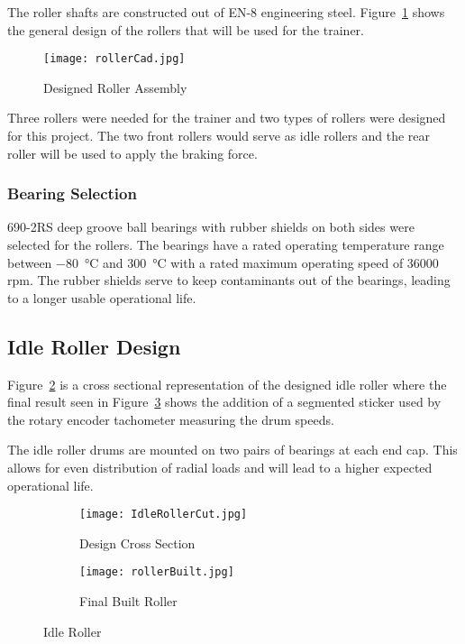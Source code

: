The roller shafts are constructed out of EN-8 engineering steel. Figure~\ref{fig:rollerGen} shows the general design of the rollers that will be used for the trainer.

\begin{figure}[H]
	\centering
	\texttt{[image: rollerCad.jpg]}
	\caption{Designed Roller Assembly}
	\label{fig:rollerGen}
\end{figure}

\vspace*{-0.7cm}

Three rollers were needed for the trainer and two types of rollers were designed for this project. The two front rollers would serve as idle rollers and the rear roller will be used to apply the braking force. 

\subsubsection{Bearing Selection}

690-2RS deep groove ball bearings with rubber shields on both sides were selected for the rollers. The bearings have a rated operating temperature range between \SI{-80}{\degreeCelsius} and \SI{300}{\degreeCelsius} with a rated maximum operating speed of 36000 \ac{rpm}. The rubber shields serve to keep contaminants out of the bearings, leading to a longer usable operational life. 

\subsection{Idle Roller Design}

Figure~\ref{fig:idlecut} is a cross sectional representation of the designed idle roller where the final result seen in Figure~\ref{fig:rollerBuild} shows the addition of a segmented sticker used by the rotary encoder tachometer measuring the drum speeds.

The idle roller drums are mounted on two pairs of bearings at each end cap. This allows for even distribution of radial loads and will lead to a higher expected operational life. 

\vspace*{-0.4cm}

\begin{figure}[H]
	\centering
	\begin{subfigure}{.5\textwidth}
		\centering
		\texttt{[image: IdleRollerCut.jpg]}
		\caption{Design Cross Section}
		\label{fig:idlecut}
	\end{subfigure}%
	\begin{subfigure}{.5\textwidth}
		\centering
		\texttt{[image: rollerBuilt.jpg]}
		\caption{Final Built Roller}
		\label{fig:rollerBuild}
	\end{subfigure}
	\caption{Idle Roller}
	\label{fig:rollerdets}
\end{figure}

